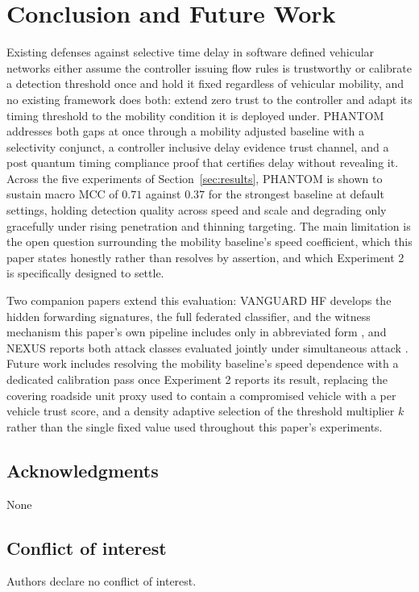 \documentclass[final,5p,twocolumn]{elsarticle}
\theoremstyle{remark}
\theoremstyle{plain}
\begin{document}
\section{Conclusion and Future Work}

Existing defenses against selective time delay in software defined
vehicular networks either assume the controller issuing flow rules is
trustworthy or calibrate a detection threshold once and hold it fixed
regardless of vehicular mobility, and no existing framework does both:
extend zero trust to the controller and adapt its timing threshold to the
mobility condition it is deployed under. PHANTOM addresses both gaps at
once through a mobility adjusted baseline with a selectivity conjunct, a
controller inclusive delay evidence trust channel, and a post quantum
timing compliance proof that certifies delay without revealing it. Across
the five experiments of Section~\ref{sec:results}, PHANTOM is shown to
sustain macro MCC of $0.71$ against $0.37$ for the strongest baseline at
default settings, holding detection quality across speed and scale and
degrading only gracefully under rising penetration and thinning targeting. The main limitation is the open question surrounding the
mobility baseline's speed coefficient, which this paper states honestly
rather than resolves by assertion, and which Experiment 2 is specifically
designed to settle.

Two companion papers extend this evaluation: VANGUARD HF develops the
hidden forwarding signatures, the full federated classifier, and the
witness mechanism this paper's own pipeline includes only in abbreviated
form \cite{VanguardHF2026}, and NEXUS reports both attack classes evaluated
jointly under simultaneous attack \cite{Nexus2026}. Future work includes
resolving the mobility baseline's speed dependence with a dedicated
calibration pass once Experiment 2 reports its result, replacing the
covering roadside unit proxy used to contain a compromised vehicle with a
per vehicle trust score, and a density adaptive selection of the threshold
multiplier $k$ rather than the single fixed value used throughout this
paper's experiments.

\subsection{Acknowledgments}
\noindent None

\subsection{Conflict of interest}
\noindent Authors declare no conflict of interest.
\end{document}
